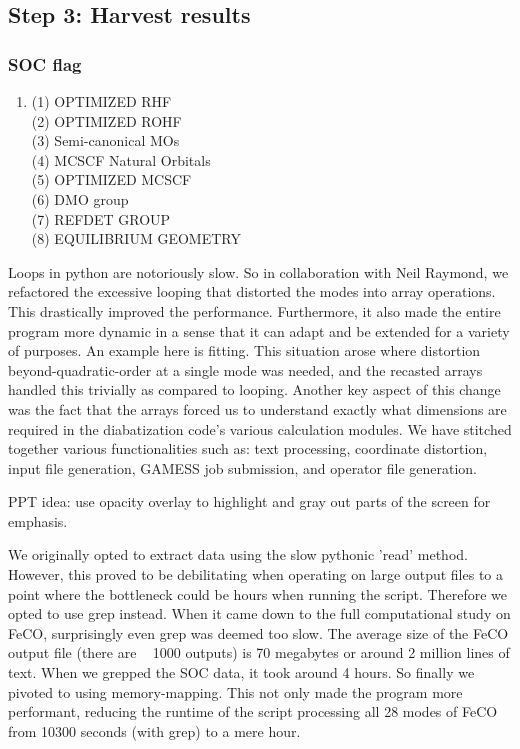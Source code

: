 \subsection{Step 3: Harvest results}
\subsubsection{SOC flag}

\begin{enumerate}[nosep]
\centering
    \item (1) OPTIMIZED RHF \\
    (2) OPTIMIZED ROHF \\
    (3) Semi-canonical MOs \\
    (4) MCSCF Natural Orbitals \\
    (5) OPTIMIZED MCSCF \\ 
    (6) DMO group \\ 
    (7) REFDET GROUP \\ 
    (8) EQUILIBRIUM GEOMETRY \\
\end{enumerate}

 Loops in python are notoriously slow. So in collaboration with Neil Raymond, we refactored the excessive looping that distorted the modes into array operations. This drastically improved the performance. Furthermore, it also made the entire program more dynamic in a sense that it can adapt and be extended for a variety of purposes. An example here is fitting. This situation arose where distortion beyond-quadratic-order at a single mode was needed, and the recasted arrays handled this trivially as compared to looping. Another key aspect of this change was the fact that the arrays forced us to understand exactly what dimensions are required in the diabatization code's various calculation modules. We have stitched together various functionalities such as: text processing, coordinate distortion, input file generation, GAMESS job submission, and operator file generation. 

PPT idea: use opacity overlay to highlight and gray out parts of the screen for emphasis.

We originally opted to extract data using the slow pythonic 'read' method. However, this proved to be debilitating when operating on large output files to a point where the bottleneck could be hours when running the script. Therefore we opted to use grep instead. When it came down to the full computational study on FeCO, surprisingly even grep was deemed too slow. The average size of the FeCO output file (there are ~ 1000 outputs) is 70 megabytes or around 2 million lines of text. When we grepped the SOC data, it took around 4 hours. So finally we pivoted to using memory-mapping. This not only made the program more performant, reducing the runtime of the script processing all 28 modes of FeCO from 10300 seconds (with grep) to a mere hour.

